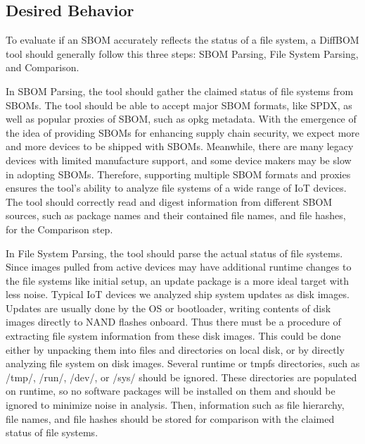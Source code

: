 \subsection{Desired Behavior}
To evaluate if an SBOM accurately reflects the status of a file system, a DiffBOM tool should generally follow this three steps: SBOM Parsing, File System Parsing, and Comparison.\par
In SBOM Parsing, the tool should gather the claimed status of file systems from SBOMs. The tool should be able to accept major SBOM formats, like SPDX, as well as popular proxies of SBOM, such as opkg metadata. With the emergence of the idea of providing SBOMs for enhancing supply chain security, we expect more and more devices to be shipped with SBOMs. Meanwhile, there are many legacy devices with limited manufacture support, and some device makers may be slow in adopting SBOMs. Therefore, supporting multiple SBOM formats and proxies ensures the tool's ability to analyze file systems of a wide range of IoT devices. The tool should correctly read and digest information from different SBOM sources, such as package names and their contained file names, and file hashes, for the Comparison step.\par
In File System Parsing, the tool should parse the actual status of file systems. Since images pulled from active devices may have additional runtime changes to the file systems like initial setup, an update package is a more ideal target with less noise. Typical IoT devices we analyzed ship system updates as disk images. Updates are usually done by the OS or bootloader, writing contents of disk images directly to NAND flashes onboard. Thus there must be a procedure of extracting file system information from these disk images. This could be done either by unpacking them into files and directories on local disk, or by directly analyzing file system on disk images. Several runtime or tmpfs directories, such as /tmp/, /run/, /dev/, or /sys/ should be ignored. These directories are populated on runtime, so no software packages will be installed on them and should be ignored to minimize noise in analysis. Then, information such as file hierarchy, file names, and file hashes should be stored for comparison with the claimed status of file systems.\par
